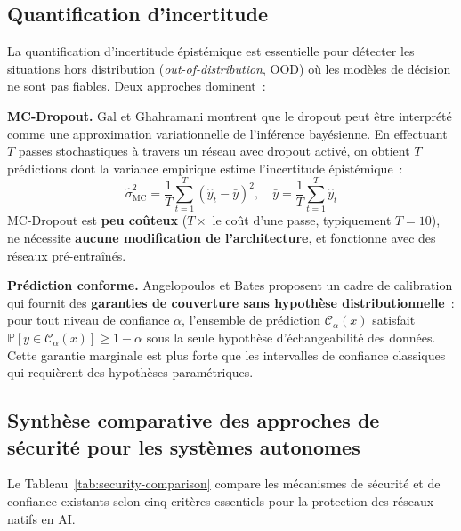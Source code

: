 \subsection{Quantification d'incertitude}

La quantification d'incertitude épistémique est essentielle pour détecter les situations hors distribution (\emph{out-of-distribution}, OOD) où les modèles de décision ne sont pas fiables. Deux approches dominent~:

\textbf{MC-Dropout.} Gal et Ghahramani \cite{gal2016dropout} montrent que le dropout peut être interprété comme une approximation variationnelle de l'inférence bayésienne. En effectuant $T$ passes stochastiques à travers un réseau avec dropout activé, on obtient $T$ prédictions dont la variance empirique estime l'incertitude épistémique~:
\begin{equation}
    \hat{\sigma}^2_{\text{MC}} = \frac{1}{T} \sum_{t=1}^{T} \left(\hat{y}_t - \bar{y}\right)^2, \quad \bar{y} = \frac{1}{T}\sum_{t=1}^T \hat{y}_t
\end{equation}
MC-Dropout est \textbf{peu coûteux} ($T \times$ le coût d'une passe, typiquement $T = 10$), ne nécessite \textbf{aucune modification de l'architecture}, et fonctionne avec des réseaux pré-entraînés.

\textbf{Prédiction conforme.} Angelopoulos et Bates \cite{angelopoulos2023conformal} proposent un cadre de calibration qui fournit des \textbf{garanties de couverture sans hypothèse distributionnelle}~: pour tout niveau de confiance $\alpha$, l'ensemble de prédiction $\mathcal{C}_\alpha(x)$ satisfait $\mathbb{P}[y \in \mathcal{C}_\alpha(x)] \geq 1 - \alpha$ sous la seule hypothèse d'échangeabilité des données. Cette garantie marginale est plus forte que les intervalles de confiance classiques qui requièrent des hypothèses paramétriques.

\subsection{Synthèse comparative des approches de sécurité pour les systèmes autonomes}

Le Tableau~\ref{tab:security-comparison} compare les mécanismes de sécurité et de confiance existants selon cinq critères essentiels pour la protection des réseaux natifs en AI.

